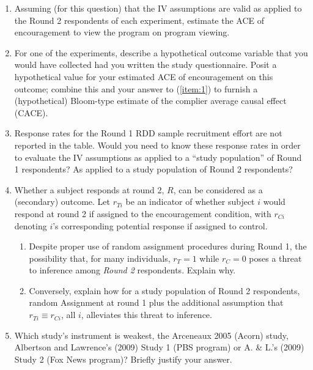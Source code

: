 \documentclass{article}
\begin{document}
\begin{enumerate}
\item \label{item:1}Assuming (for this question) that the IV assumptions are valid as applied to the Round 2 respondents of each experiment, estimate the ACE of encouragement to view the program on program viewing.
\item For one of the experiments, describe a hypothetical outcome variable that you would have collected had you written the study questionnaire. Posit a hypothetical value for your estimated ACE of encouragement on this outcome; combine this and your answer to (\ref{item:1}) to furnish a (hypothetical) Bloom-type estimate of the complier average causal effect (CACE).  
\item Response rates for the Round 1 RDD sample recruitment effort are not reported in the table. Would you need to know these response rates in order to evaluate the IV assumptions as applied to a ``study population'' of Round 1 respondents?  As applied to a study population of Round 2 respondents? 
\item Whether a subject responds at round 2, $R$, can be considered as a (secondary) outcome. Let $r_{Ti}$ be an indicator of whether subject $i$ would respond at round 2 if assigned to the encouragement condition, with $r_{Ci}$ denoting $i$'s corresponding potential response if assigned to control.
  \begin{enumerate}
  \item Despite proper use of random assignment procedures during Round 1, the possibility that, for many individuals, $r_{T}=1$ while $r_{C}=0$ poses a threat to inference among \textit{Round 2} respondents. Explain why.
  \item Conversely, explain how for a study population of Round 2 respondents, random Assignment at round 1 plus the additional assumption that $r_{Ti} \equiv r_{Ci}$, all $i$, alleviates this threat to inference. 
  \end{enumerate}
\item Which study's instrument is weakest, the Arceneaux 2005 (Acorn) study, Albertson and Lawrence's (2009) Study 1 (PBS program) or A. \& L.'s (2009) Study 2 (Fox News program)? Briefly justify your answer.
\end{enumerate}
\end{document}
